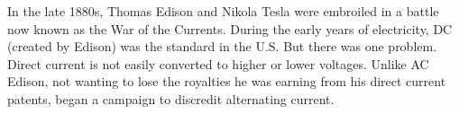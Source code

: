 \documentclass[preview]{standalone}
\begin{document}
\centering In the late 1880s, Thomas Edison and Nikola Tesla were embroiled in a battle now known as the War of the Currents. During the early years of electricity, DC (created by Edison) was the standard in the U.S. But there was one problem. Direct current is not easily converted to higher or lower voltages. Unlike AC Edison, not wanting to lose the royalties he was earning from his direct current patents, began a campaign to discredit alternating current.
\end{document}
